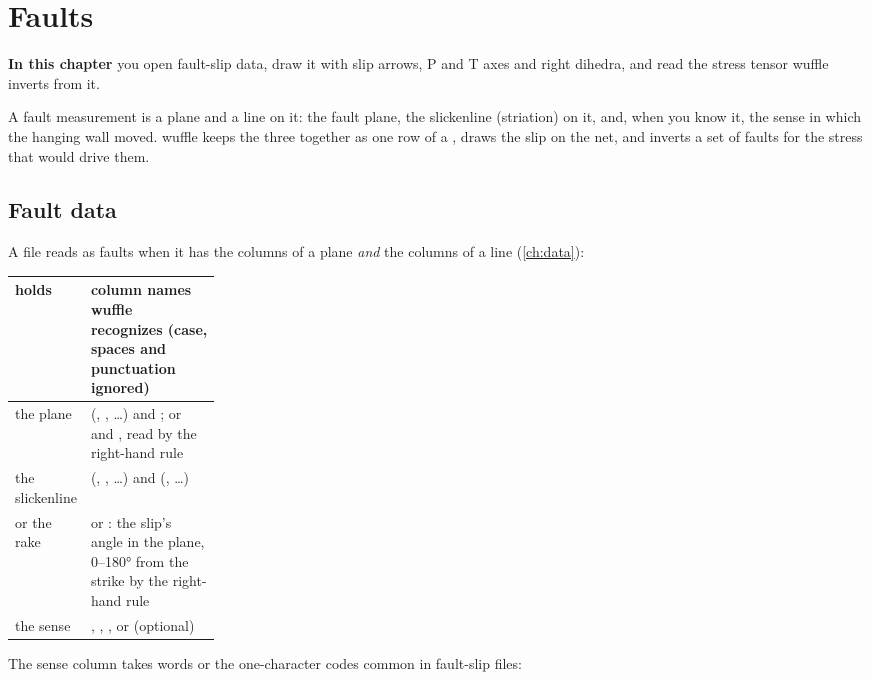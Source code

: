 \chapter{Faults}\label{ch:faults}
\begin{goals}
\textbf{In this chapter} you open fault-slip data, draw it with slip arrows, P and T axes and right
dihedra, and read the stress tensor wuffle inverts from it.
\end{goals}

A fault measurement is a plane and a line on it: the fault plane, the slickenline (striation) on it, and,
when you know it, the sense in which the hanging wall moved. wuffle keeps the three together as one row of
a , draws the slip on the net, and inverts a set of faults for the stress
that would drive them.

\section{Fault data}\label{sec:fault-data}

A file reads as faults when it has the columns of a plane \emph{and} the columns of a line
(\cref{ch:data}):

\begin{center}\small
\begin{tabularx}{\linewidth}{@{}>{\raggedright}p{0.24\linewidth}L@{}}\toprule
\sffamily\bfseries holds & \sffamily\bfseries column names wuffle recognizes (case, spaces and punctuation ignored) \\\midrule
the plane &  (, , …) and ; or  and , read by the right-hand rule \\
the slickenline &  (, , …) and  (, …) \\
or the rake &  or : the slip's angle in the plane, 0–180° from the strike by the right-hand rule \\
the sense & , , ,  or  (optional) \\
\bottomrule\end{tabularx}
\end{center}

The sense column takes words or the one-character codes common in fault-slip files:

